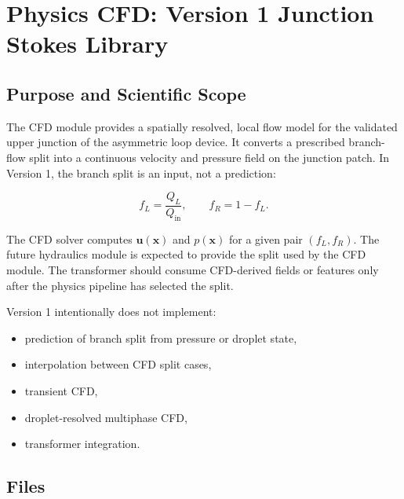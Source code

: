 \section{Physics CFD: Version 1 Junction Stokes Library}

\subsection{Purpose and Scientific Scope}

The CFD module provides a spatially resolved, local flow model for the
validated upper junction of the asymmetric loop device. It converts a prescribed
branch-flow split into a continuous velocity and pressure field on the junction
patch. In Version 1, the branch split is an input, not a prediction:

\[
  f_L = \frac{Q_L}{Q_{\mathrm{in}}},
  \qquad
  f_R = 1 - f_L.
\]

The CFD solver computes \(\mathbf{u}(\mathbf{x})\) and \(p(\mathbf{x})\) for a
given pair \((f_L, f_R)\). The future hydraulics module is expected to provide
the split used by the CFD module. The transformer should consume CFD-derived
fields or features only after the physics pipeline has selected the split.

Version 1 intentionally does not implement:

\begin{itemize}
  \item prediction of branch split from pressure or droplet state,
  \item interpolation between CFD split cases,
  \item transient CFD,
  \item droplet-resolved multiphase CFD,
  \item transformer integration.
\end{itemize}

\subsection{Files}

